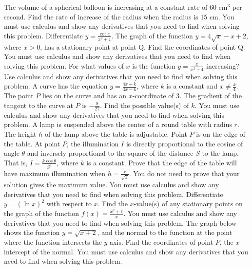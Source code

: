 \documentclass[12pt,addpoints]{exam}
\begin{document}
\begin{questions}
\fillwithlines{5cm}
\question[5] The volume of a spherical balloon is increasing at a constant rate of 60 cm\(^3\) per second. Find the rate of increase of the radius when the radius is 15 cm. You must use calculus and show any derivatives that you need to find when solving this problem.
\fillwithlines{5cm}
\question[5] Differentiate \( y = \frac{\cot x}{x^2 + 1} \).
\fillwithlines{5cm}
\question[5] The graph of the function \( y = 4\sqrt{x} - x + 2 \), where \( x > 0 \), has a stationary point at point Q. Find the coordinates of point Q. You must use calculus and show any derivatives that you need to find when solving this problem.
\fillwithlines{5cm}
\question[5] For what values of \( x \) is the function \( y = \frac{x}{x^2 + 4} \) increasing? Use calculus and show any derivatives that you need to find when solving this problem.
\fillwithlines{5cm}
\question[5] A curve has the equation \( y = \frac{4x + k}{4x - k} \), where \( k \) is a constant and \( x \neq \frac{k}{4} \). The point \( P \) lies on the curve and has an \( x \)-coordinate of 3. The gradient of the tangent to the curve at \( P \) is \(-\frac{8}{27}\). Find the possible value(s) of \( k \). You must use calculus and show any derivatives that you need to find when solving this problem.
\fillwithlines{5cm}
\question[5] A lamp is suspended above the center of a round table with radius \( r \). The height \( h \) of the lamp above the table is adjustable. Point \( P \) is on the edge of the table. At point \( P \), the illumination \( I \) is directly proportional to the cosine of angle \( \theta \) and inversely proportional to the square of the distance \( S \) to the lamp. That is, \( I = \frac{k \cos \theta}{S^2} \), where \( k \) is a constant. Prove that the edge of the table will have maximum illumination when \( h = \frac{r}{\sqrt{2}} \). You do not need to prove that your solution gives the maximum value. You must use calculus and show any derivatives that you need to find when solving this problem.
\fillwithlines{5cm}
\question[5] Differentiate \( y = (\ln x)^2 \) with respect to \( x \).
\fillwithlines{5cm}
\question[5] Find the \( x \)-value(s) of any stationary points on the graph of the function \( f(x) = \frac{x^2 + 1}{x} \). You must use calculus and show any derivatives that you need to find when solving this problem.
\fillwithlines{5cm}
\question[5] The graph below shows the function \( y = \sqrt{x+2} \), and the normal to the function at the point where the function intersects the \( y \)-axis. Find the coordinates of point \( P \), the \( x \)-intercept of the normal. You must use calculus and show any derivatives that you need to find when solving this problem.

\end{questions}
\end{document}
